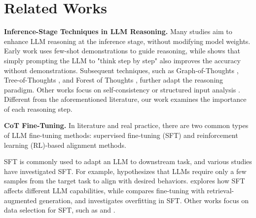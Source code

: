 \section{Related Works}
\label{sec:related}
\vspace{-0.0in}
\noindent\textbf{Inference-Stage Techniques in LLM Reasoning.} Many studies aim to enhance LLM reasoning at the inference stage, without modifying model weights. Early work \cite{wei2022chain} uses few-shot demonstrations to guide reasoning, while \cite{kojima2022large} shows that simply prompting the LLM to "think step by step" also improves the accuracy without demonstrations. Subsequent techniques, such as Graph-of-Thoughts \cite{besta2024graph}, Tree-of-Thoughts \cite{yao2024tree}, and Forest of Thoughts \cite{bi2024forest}, further adapt the reasoning paradigm. Other works focus on self-consistency \cite{wang2022self,wan2023better} or structured input analysis \cite{he2024make}. Different from the aforementioned literature, our work examines the importance of each reasoning step.


\noindent\textbf{CoT Fine-Tuning.}
In literature and real practice, there are two common types of LLM fine-tuning methods: supervised fine-tuning (SFT) and reinforcement learning (RL)-based alignment methods.

SFT is commonly used to adapt an LLM to downstream task, and various studies have investigated SFT. For example, \cite{zhou2024lima} hypothesizes that LLMs require only a few samples from the target task to align with desired behaviors.\cite{dong2023abilities} explores how SFT affects different LLM capabilities, while \cite{ovadia2023fine} compares fine-tuning with retrieval-augmented generation, and \cite{ling2024deductive} investigates overfitting in SFT. Other works focus on data selection for SFT, such as \cite{shen2024rethinking} and \cite{zhang2024balancing}.

